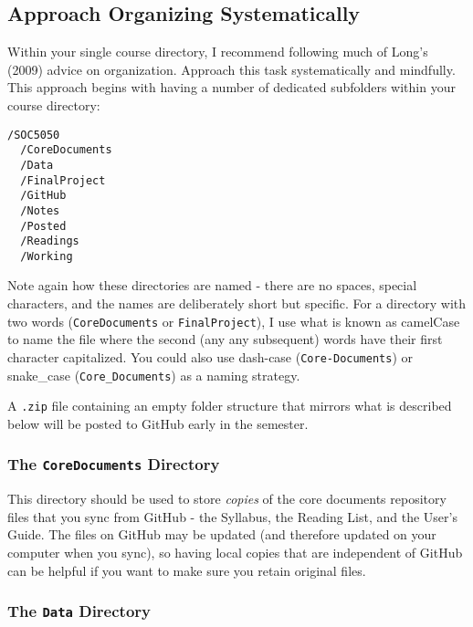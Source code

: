 \documentclass[]{book}
\begin{document}
\subsection{Approach Organizing
Systematically}\label{approach-organizing-systematically}

Within your single course directory, I recommend following much of
Long's (2009) advice on organization. Approach this task systematically
and mindfully. This approach begins with having a number of dedicated
subfolders within your course directory:

\begin{verbatim}
/SOC5050
  /CoreDocuments
  /Data
  /FinalProject
  /GitHub
  /Notes
  /Posted
  /Readings
  /Working
\end{verbatim}

Note again how these directories are named - there are no spaces,
special characters, and the names are deliberately short but specific.
For a directory with two words (\texttt{CoreDocuments} or
\texttt{FinalProject}), I use what is known as camelCase to name the
file where the second (any any subsequent) words have their first
character capitalized. You could also use dash-case
(\texttt{Core-Documents}) or snake\_case (\texttt{Core\_Documents}) as a
naming strategy.

A \texttt{.zip} file containing an empty folder structure that mirrors
what is described below will be posted to GitHub early in the semester.

\subsubsection{\texorpdfstring{The \texttt{CoreDocuments}
Directory}{The CoreDocuments Directory}}\label{the-coredocuments-directory}

This directory should be used to store \emph{copies} of the core
documents repository files that you sync from GitHub - the Syllabus, the
Reading List, and the User's Guide. The files on GitHub may be updated
(and therefore updated on your computer when you sync), so having local
copies that are independent of GitHub can be helpful if you want to make
sure you retain original files.

\subsubsection{\texorpdfstring{The \texttt{Data}
Directory}{The Data Directory}}\label{the-data-directory}
\end{document}
